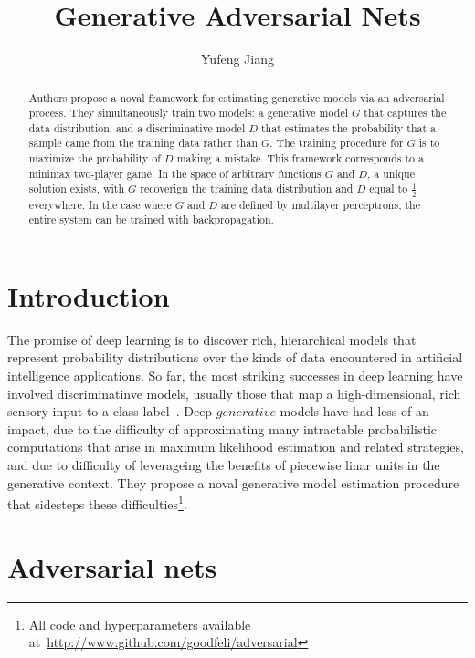 \documentclass[10pt,twocolumn,letterpaper]{article}
\begin{document}
\title{Generative Adversarial Nets}
\author{Yufeng Jiang}
\maketitle

\begin{abstract}

Authors propose a noval framework for estimating generative models via an adversarial process. They simultaneously train two models: a generative model $G$ that captures the data distribution, and a discriminative model $D$ that estimates the probability that a sample came from the training data rather than $G$. The training procedure for $G$ is to maximize the probability of $D$ making a mistake. This framework corresponds to a minimax two-player game. In the space of arbitrary functions $G$ and $D$, a unique solution exists, with $G$ recoverign the training data distribution and $D$ equal to $\frac{1}{2}$ everywhere. In the case where $G$ and $D$ are defined by multilayer perceptrons, the entire system can be trained with backpropagation. 

\end{abstract}

\section{Introduction}

The promise of deep learning is to discover rich, hierarchical models that represent probability distributions over the kinds of data encountered in artificial intelligence applications. So far, the most striking successes in deep learning have involved discriminatinve models, usually those that map a high-dimensional, rich sensory input to a class label~\cite{Image}. Deep $generative$ models have had less of an impact, due to the difficulty of approximating many intractable probabilistic computations that arise in maximum likelihood estimation and related strategies, and due to difficulty of leverageing the benefits of piecewise linar units in the generative context. They propose a noval generative model estimation procedure that sidesteps these difficulties\footnote{All code and hyperparameters available at~\url{http://www.github.com/goodfeli/adversarial}}.

\section{Adversarial nets}
\end{document}
